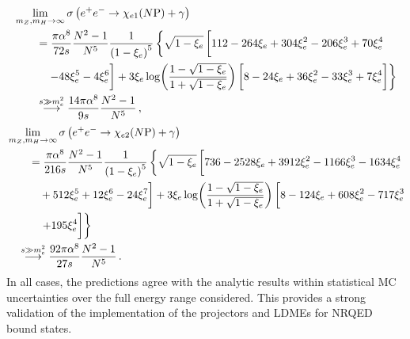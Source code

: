 \begin{align}
    & \lim_{m_Z,m_H\to\infty}\sigma\left(e^+e^-\to\chi_{e 1}(N\mathrm{P})+\gamma\right)\nonumber\\
    &\qquad = \dfrac{\pi\alpha^8}{72s}\dfrac{N^2-1}{N^5}\dfrac{1}{\left(1-\xi_e\right)^5}\left\lbrace\sqrt{1-\xi_e}\,\bigg\lbrack 112 - 264 \xi_{e} + 304\xi_{e}^{2} - 206 \xi_{e}^{3} + 70 \xi_{e}^{4} \right.\nonumber\\
    &\qquad\quad\left. - 48 \xi_{e}^{5} - 4 \xi_{e}^{6} \bigg\rbrack + 3\xi_{e}\log\!\left(\dfrac{1-\sqrt{1-\xi_e}}{1+\sqrt{1-\xi_e}}\right)\bigg\lbrack 8 - 24 \xi_{e} + 36 \xi_{e}^{2} - 33 \xi_{e}^{3} + 7 \xi_{e}^{4} \bigg\rbrack\right\rbrace\nonumber\\
    &\qquad\overset{s\gg m_e^2}{\longrightarrow} \dfrac{14\pi\alpha^8}{9s}\dfrac{N^2-1}{N^5}\,,
\end{align}
\begin{align}
    &\lim_{m_Z,m_H\to\infty}\sigma\left(e^+e^-\to\chi_{e 2}(N\mathrm{P})+\gamma\right)\nonumber\\
    &\qquad = \dfrac{\pi\alpha^8}{216s}\dfrac{N^2-1}{N^5}\dfrac{1}{\left(1-\xi_e\right)^5}\left\lbrace\sqrt{1-\xi_e}\,\bigg\lbrack 736 - 2528 \xi_{e} + 3912\xi_{e}^{2} - 1166 \xi_{e}^{3} - 1634 \xi_{e}^{4}\right.\nonumber\\
    &\qquad\quad + 512 \xi_{e}^{5} + 12 \xi_{e}^{6} - 24 \xi_{e}^{7}  \bigg\rbrack+3\xi_{e}\log\!\left(\dfrac{1-\sqrt{1-\xi_e}}{1+\sqrt{1-\xi_e}}\right)\bigg\lbrack 8 - 124 \xi_{e} + 608 \xi_{e}^{2} - 717 \xi_{e}^{3}\nonumber \\
    &\qquad\quad\left. + 195 \xi_{e}^{4} \bigg\rbrack\right\rbrace \nonumber\\
    &\quad\overset{s\gg m_e^2}{\longrightarrow} \dfrac{92\pi\alpha^8}{27s}\dfrac{N^2-1}{N^5}\,.
\end{align}
In all cases, the \mgshort{} predictions agree with the analytic results within statistical MC uncertainties over the full energy range considered. This provides a strong validation of the implementation of the \pwavetxt{} projectors and LDMEs for NRQED bound states.

